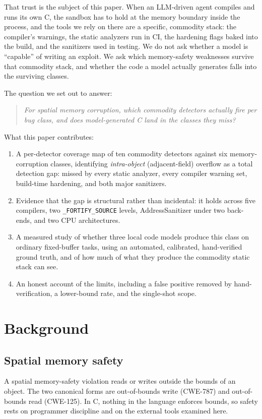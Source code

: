 \documentclass[11pt]{article}
\begin{document}
That trust is the subject of this paper. When an LLM-driven agent compiles and runs its own
C, the sandbox has to hold at the memory boundary inside the process, and the tools we rely
on there are a specific, commodity stack: the compiler's warnings, the static analyzers run
in CI, the hardening flags baked into the build, and the sanitizers used in testing. We do
not ask whether a model is ``capable'' of writing an exploit. We ask which memory-safety
weaknesses survive that commodity stack, and whether the code a model actually generates
falls into the surviving classes.

The question we set out to answer:

\begin{quote}
\emph{For spatial memory corruption, which commodity detectors actually fire per bug class,
and does model-generated C land in the classes they miss?}
\end{quote}

What this paper contributes:

\begin{enumerate}[leftmargin=1.6em]
  \item A per-detector coverage map of ten commodity detectors against six
        memory-corruption classes, identifying \emph{intra-object} (adjacent-field)
        overflow as a total detection gap: missed by every static analyzer, every compiler
        warning set, build-time hardening, and both major sanitizers.
  \item Evidence that the gap is structural rather than incidental: it holds across five
        compilers, two \texttt{\_FORTIFY\_SOURCE} levels, AddressSanitizer under two
        back-ends, and two CPU architectures.
  \item A measured study of whether three local code models produce this class on ordinary
        fixed-buffer tasks, using an automated, calibrated, hand-verified ground truth, and
        of how much of what they produce the commodity static stack can see.
  \item An honest account of the limits, including a false positive removed by
        hand-verification, a lower-bound rate, and the single-shot scope.
\end{enumerate}

\section*{Background}

\subsection*{Spatial memory safety}
A spatial memory-safety violation reads or writes outside the bounds of an object. The two
canonical forms are out-of-bounds write (CWE-787) and out-of-bounds read (CWE-125). In C,
nothing in the language enforces bounds, so safety rests on programmer discipline and on the
external tools examined here.
\end{document}
